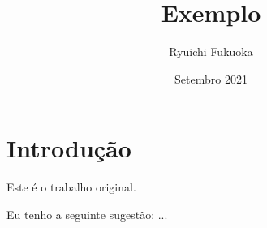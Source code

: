 \documentclass{article}
\title{Exemplo}
\author{Ryuichi Fukuoka}
\date{Setembro 2021}
\begin{document}
\maketitle
\section{Introdução}
\indent

Este é o trabalho original.

Eu tenho a seguinte sugestão: ...
\end{document}
